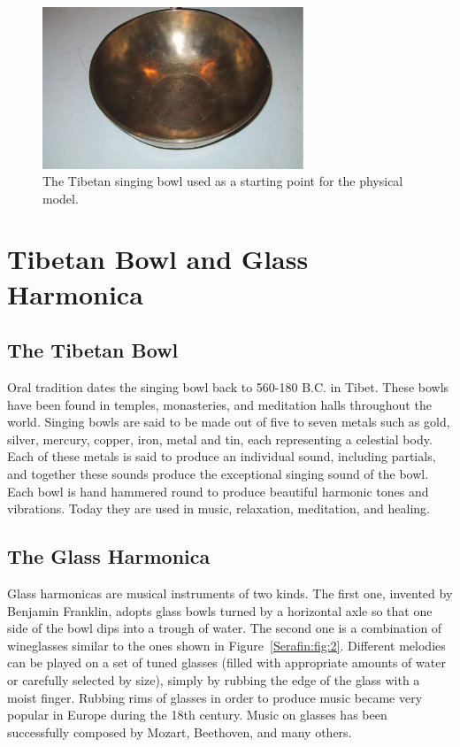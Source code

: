 \begin{figure}[t]
\centering
\includegraphics[width=7.8cm]{bowlcarr-eps-converted-to.pdf}
\caption{The Tibetan singing bowl used as a starting point
for the physical model.}
  \label{Serafin:fig:1}
\end{figure}

\section{Tibetan Bowl and Glass Harmonica}

\subsection{The Tibetan Bowl}

Oral tradition dates the singing bowl back to 560-180 B.C. in Tibet. These bowls have been found in temples, monasteries, and meditation halls throughout the world. Singing bowls are said to be made out of five to seven metals such as gold, silver, mercury, copper, iron, metal and tin, each representing a celestial body. Each of these metals is said to produce an individual sound, including partials, and together these sounds produce the exceptional singing sound of the bowl.  Each bowl is hand hammered round to produce beautiful harmonic tones and vibrations. Today they are used in music, relaxation, meditation, and healing.

\subsection{The Glass Harmonica}
Glass harmonicas are musical instruments of two kinds. The first one, invented by Benjamin Franklin, adopts glass bowls turned by a horizontal axle so that one side of the bowl dips into a trough of water. The second one is a combination of wineglasses similar to the ones shown in Figure~\ref{Serafin:fig:2}. Different melodies can be played on a set of tuned glasses (filled with appropriate amounts of water or carefully selected by size), simply by rubbing the edge of the glass with a moist finger. Rubbing rims of glasses in order to produce music became very popular in Europe during the 18th century. Music on glasses has been successfully composed by Mozart, Beethoven, and many others.

